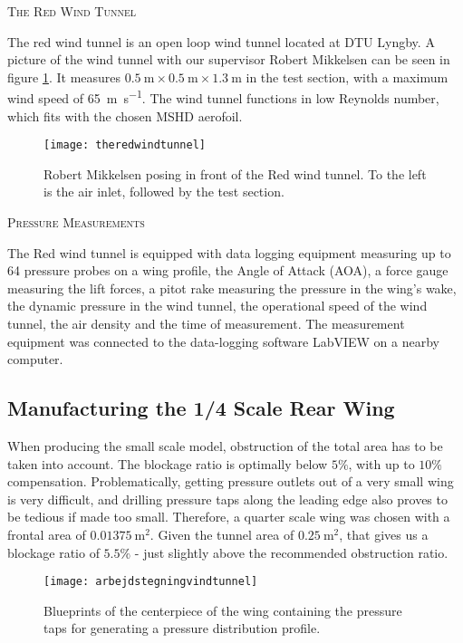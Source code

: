     \textsc{The Red Wind Tunnel}

      The red wind tunnel is an open loop wind tunnel located at DTU Lyngby. A picture of the wind tunnel with our supervisor Robert Mikkelsen can be seen in figure \ref{fig:theredwindtunnel}. It measures $\SI{0.5}{\metre} \times \SI{0.5}{\metre} \times \SI{1.3}{\metre}$ in the test section, with a maximum wind speed of \SI{65}{\metre\per\second}. The wind tunnel functions in low Reynolds number, which fits with the chosen MSHD aerofoil.

      \begin{figure}
        \texttt{[image: theredwindtunnel]}
        \caption{Robert Mikkelsen posing in front of the Red wind tunnel. To the left is the air inlet, followed by the test section.}
        \label{fig:theredwindtunnel}
      \end{figure}

    \textsc{Pressure Measurements}

      The Red wind tunnel is equipped with data logging equipment measuring up to 64 pressure probes on a wing profile, the Angle of Attack (AOA), a force gauge measuring the lift forces, a pitot rake measuring the pressure in the wing's wake, the dynamic pressure in the wind tunnel, the operational speed of the wind tunnel, the air density and the time of measurement. The measurement equipment was connected to the data-logging software LabVIEW on a nearby computer.

  \subsection{Manufacturing the 1/4 Scale Rear Wing}

    When producing the small scale model, obstruction of the total area has to be taken into account. The blockage ratio is optimally below $5\%$, with up to $10\%$ compensation. Problematically, getting pressure outlets out of a very small wing is very difficult, and drilling pressure taps along the leading edge also proves to be tedious if made too small. Therefore, a quarter scale wing was chosen with a frontal area of $\SI{0.01375}{\metre\squared}$. Given the tunnel area of $\SI{0.25}{\metre\squared}$, that gives us a blockage ratio of $5.5\%$ - just slightly above the recommended obstruction ratio.

    \begin{figure}
      \texttt{[image: arbejdstegningvindtunnel]}
      \caption{Blueprints of the centerpiece of the wing containing the pressure taps for generating a pressure distribution profile.}
      \label{fig:scalewingblueprint}
    \end{figure}

